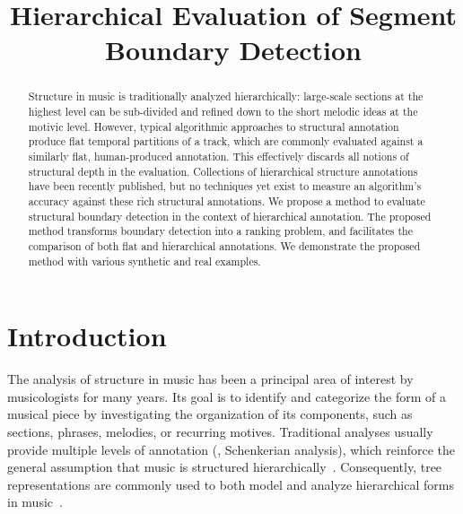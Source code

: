 \documentclass{article}
\title{Hierarchical Evaluation of Segment Boundary Detection}
\begin{document}
%
\maketitle
%
\begin{abstract}
Structure in music is traditionally analyzed hierarchically: large-scale sections at the highest level can be sub-divided and refined down to the short melodic ideas at the motivic level. 
However, typical algorithmic approaches to structural annotation produce flat temporal partitions of a track, which are commonly evaluated against a similarly flat, human-produced
annotation. This effectively discards all notions of structural depth in the evaluation.
Collections of hierarchical structure annotations have been recently published, but no techniques yet exist to
measure an algorithm's accuracy against these rich structural annotations.
We propose a method to evaluate structural boundary detection in the context of hierarchical annotation.
The proposed method transforms boundary detection into a ranking problem, and facilitates the comparison of
both flat and hierarchical annotations.
We demonstrate the proposed method with various synthetic and real examples. 
\end{abstract}
%
\section{Introduction}\label{sec:introduction}

The analysis of structure in music has been a principal area of interest by musicologists for many years.
Its goal is to identify and categorize the form of a musical piece by investigating the organization of its components, such as sections, phrases, melodies, or recurring motives.
Traditional analyses usually provide multiple levels of annotation (\eg, Schenkerian analysis), which reinforce the general assumption that music is structured hierarchically~\cite{Lerdahl1983a}.
Consequently, tree representations are commonly used to both model and analyze hierarchical forms in music~\cite{Lerdahl1983}.
\end{document}
